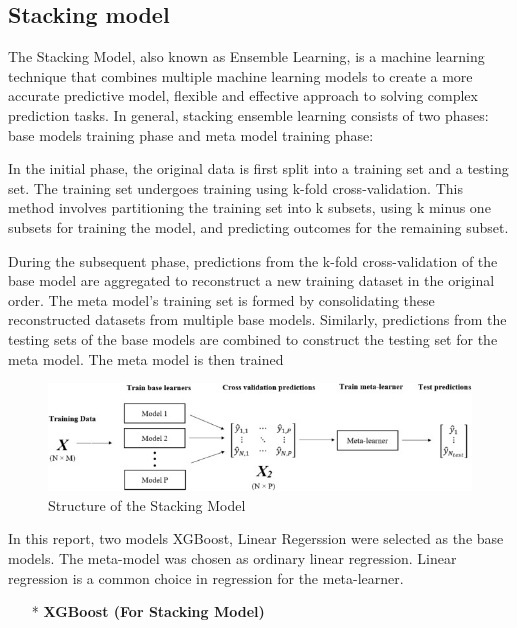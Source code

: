 \documentclass{ieeeojies}
\begin{document}
\subsection{Stacking model} 
The Stacking Model, also known as Ensemble Learning, is a machine learning technique that combines multiple machine learning models to create a more accurate predictive model, flexible and effective approach to solving complex prediction tasks. In general, stacking ensemble learning consists of two phases: base models training phase and meta model training phase:\

In the initial phase, the original data is first split into a training set and a testing set. The training set undergoes training using k-fold cross-validation. This method involves partitioning the training set into k subsets, using k minus one subsets for training the model, and predicting outcomes for the remaining subset.

During the subsequent phase, predictions from the k-fold cross-validation of the base model are aggregated to reconstruct a new training dataset in the original order. The meta model's training set is formed by consolidating these reconstructed datasets from multiple base models. Similarly, predictions from the testing sets of the base models are combined to construct the testing set for the meta model. The meta model is then trained

\begin{figure}[H]
  \centering
  \begin{minipage}{1.0\linewidth}
    \centering
    \includegraphics[width=\linewidth]{Figure_algorithm/stackingmodel.jpg}
    \caption{Structure of the Stacking Model \cite{stack_fig}}
  \end{minipage}
\end{figure}

In this report, two models XGBoost, Linear Regerssion  were selected as the base models. The meta-model was chosen as ordinary linear regression. Linear regression is a common choice in regression for the meta-learner.

\begin{itemize}
    \item[*] \textbf{XGBoost (For Stacking Model)}
\end{itemize} 
\end{document}
